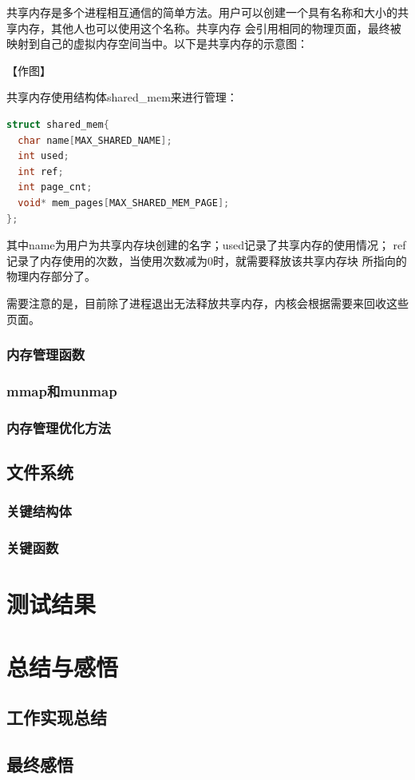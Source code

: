 \documentclass[UTF8,a4paper,10pt]{ctexart}
\begin{document}
共享内存是多个进程相互通信的简单方法。用户可以创建一个具有名称和大小的共享内存，其他人也可以使用这个名称。共享内存
会引用相同的物理页面，最终被映射到自己的虚拟内存空间当中。以下是共享内存的示意图：

【作图】

共享内存使用结构体shared\_mem来进行管理：

\begin{lstlisting}[title=shared\_mem结构体,frame=trbl,language={C}]
struct shared_mem{
  char name[MAX_SHARED_NAME];
  int used;
  int ref;
  int page_cnt;
  void* mem_pages[MAX_SHARED_MEM_PAGE];
};
\end{lstlisting}

其中name为用户为共享内存块创建的名字；used记录了共享内存的使用情况；
ref记录了内存使用的次数，当使用次数减为0时，就需要释放该共享内存块
所指向的物理内存部分了。

需要注意的是，目前除了进程退出无法释放共享内存，内核会根据需要来回收这些页面。

\subsubsection{内存管理函数}
\subsubsection{mmap和munmap}
\subsubsection{内存管理优化方法}



\subsection{文件系统}



\subsubsection{关键结构体}
\subsubsection{关键函数}


\section{测试结果}

\section{总结与感悟}

\subsection{工作实现总结}

\subsection{最终感悟}
\end{document}

